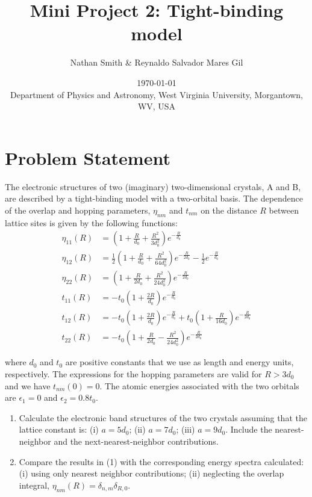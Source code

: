 \documentclass[11pt]{article}
\title{Mini Project 2: Tight-binding model}
\author{Nathan Smith \& Reynaldo Salvador Mares Gil}
\date{\today\\[4pt]
\small Department of Physics and Astronomy, West Virginia University, Morgantown, WV, USA}
\begin{document}
\maketitle

\section{Problem Statement}

The electronic structures of two (imaginary) two-dimensional crystals, A and B, are described
by a tight-binding model with a two-orbital basis. The dependence of the overlap and hopping
parameters, $\eta_{nm}$ and $t_{nm}$ on the distance $R$ between lattice sites is given by the following functions:
\begin{align*}
\eta_{11} (R) &= \left( 1 + \frac{R}{d_0} + \frac{R^2}{3d^2_0} \right) e^{-\frac{R}{d_0}} \\[6pt]
\eta_{12} (R) &= \frac{1}{2} \left( 1 + \frac{R}{d_0} + \frac{R^2}{64d^2_0} \right) e^{-\frac{R}{2d_0}} - \frac{1}{2} e^{-\frac{R}{d_0}} \\[6pt]
\eta_{22} (R) &= \left( 1 + \frac{R}{2d_0} + \frac{R^2}{24d^2_0} \right) e^{-\frac{R}{2d_0}} \\[6pt]
t_{11} (R) &= -t_0 \left( 1 + \frac{2R}{d_0} \right) e^{-\frac{R}{d_0}} \\[6pt]
t_{12} (R) &= -t_0 \left( 1 + \frac{2R}{d_0} \right) e^{-\frac{R}{d_0}} + t_0 \left( 1 + \frac{R}{16d_0} \right) e^{-\frac{R}{2d_0}} \\[6pt]
t_{22} (R) &= -t_0 \left( 1 + \frac{R}{2d_0} - \frac{R^2}{24d^2_0} \right) e^{-\frac{R}{2d_0}}
\end{align*}

where $d_0$ and $t_0$ are positive constants that we use as length and energy units, respectively. The expressions for the hopping parameters are valid for $R > 3d_0$ and we have $t_{nm} (0) = 0$. The atomic energies associated with the two orbitals are $\epsilon_1 = 0$ and $\epsilon_2 = 0.8 t_0$.

\begin{enumerate}
    \item Calculate the electronic band structures of the two crystals assuming that the lattice constant is: (i) $a = 5d_0$; (ii) $a = 7d_0$; (iii) $a = 9d_0$. Include the nearest-neighbor and the next-nearest-neighbor contributions.
    \item Compare the results in (1) with the corresponding energy spectra calculated: (i) using only nearest neighbor contributions; (ii) neglecting the overlap integral, $\eta_{nm} (R) = \delta_{n,m} \delta_{R,0}$.
\end{enumerate}
\end{document}
